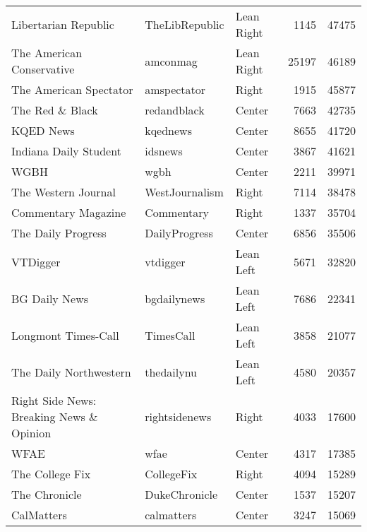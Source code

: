 \begin{center}
\begin{longtable}{lllrr}
                     Libertarian Republic &   TheLibRepublic &    Lean Right &              1145 &      47475 \\
                The American Conservative &         amconmag &    Lean Right &             25197 &      46189 \\
                   The American Spectator &      amspectator &         Right &              1915 &      45877 \\
                          The Red \& Black &      redandblack &        Center &              7663 &      42735 \\
                                KQED News &         kqednews &        Center &              8655 &      41720 \\
                    Indiana Daily Student &          idsnews &        Center &              3867 &      41621 \\
                                     WGBH &             wgbh &        Center &              2211 &      39971 \\
                      The Western Journal &   WestJournalism &         Right &              7114 &      38478 \\
                      Commentary Magazine &       Commentary &         Right &              1337 &      35704 \\
                       The Daily Progress &    DailyProgress &        Center &              6856 &      35506 \\
                                 VTDigger &         vtdigger &     Lean Left &              5671 &      32820 \\
                            BG Daily News &      bgdailynews &     Lean Left &              7686 &      22341 \\
                      Longmont Times-Call &        TimesCall &     Lean Left &              3858 &      21077 \\
                   The Daily Northwestern &       thedailynu &     Lean Left &              4580 &      20357 \\
 Right Side News: Breaking News \& Opinion &    rightsidenews &         Right &              4033 &      17600 \\
                                     WFAE &             wfae &        Center &              4317 &      17385 \\
                          The College Fix &       CollegeFix &         Right &              4094 &      15289 \\
                            The Chronicle &    DukeChronicle &        Center &              1537 &      15207 \\
                               CalMatters &       calmatters &        Center &              3247 &      15069 \\
\bottomrule
\end{longtable}
\end{center}
